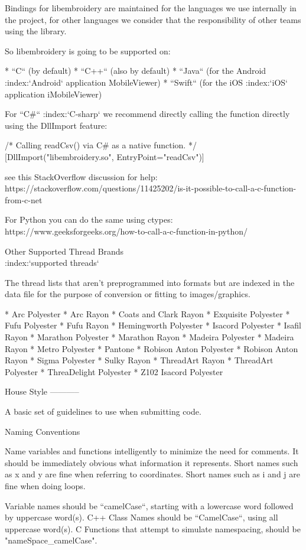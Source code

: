 \documentclass[a4paper]{report}
\begin{document}
{Bindings for libembroidery are maintained for the languages we use internally
in the project, for other languages we consider that the responsibility of
other teams using the library.

So libembroidery is going to be supported on:

* ``C`` (by default)
* ``C++`` (also by default)
* ``Java`` (for the Android :index:`Android` application MobileViewer)
* ``Swift`` (for the iOS :index:`iOS` application iMobileViewer)

For ``C#`` :index:`C-sharp` we recommend directly calling the function directly
using the DllImport feature:

    /* Calling readCsv() via C# as a native function. */
    [DllImport("libembroidery.so", EntryPoint="readCsv")]

see this StackOverflow discussion for help:
https://stackoverflow.com/questions/11425202/is-it-possible-to-call-a-c-function-from-c-net

For Python you can do the same using ctypes:
https://www.geeksforgeeks.org/how-to-call-a-c-function-in-python/

Other Supported Thread Brands
~~~~~~~~~~~~~~~~~~~~~~~~~~~~~
:index:`supported threads`

The thread lists that aren't preprogrammed into formats but are indexed in
the data file for the purpose of conversion or fitting to images/graphics.

* Arc Polyester
* Arc Rayon
* Coats and Clark Rayon
* Exquisite Polyester
* Fufu Polyester
* Fufu Rayon
* Hemingworth Polyester
* Isacord Polyester
* Isafil Rayon
* Marathon Polyester
* Marathon Rayon
* Madeira Polyester
* Madeira Rayon
* Metro Polyester
* Pantone
* Robison Anton Polyester
* Robison Anton Rayon
* Sigma Polyester
* Sulky Rayon
* ThreadArt Rayon
* ThreadArt Polyester
* ThreaDelight Polyester
* Z102 Isacord Polyester

House Style
-----------

A basic set of guidelines to use when submitting code.

Naming Conventions
~~~~~~~~~~~~~~~~~~

Name variables and functions intelligently to minimize the need for comments.
It should be immediately obvious what information it represents.
Short names such as x and y are fine when referring to coordinates.
Short names such as i and j are fine when doing loops.

Variable names should be ``camelCase``, starting with a lowercase word followed by uppercase word(s).
C++ Class Names should be ``CamelCase``, using all uppercase word(s).
C Functions that attempt to simulate namespacing, should be "nameSpace_camelCase".

}
\end{document}

